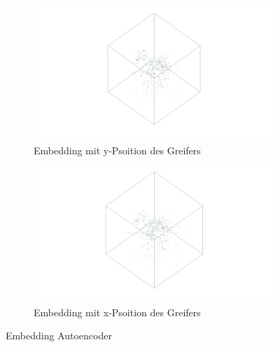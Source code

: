 	  \begin{figure}[h]
		\centering
		\begin{subfigure}[c]{0.49\textwidth}			
			\includegraphics[width=1\textwidth,center]{bilder/Hauptteil/Autoencoder_Grappel_Detection/y_embKopie.png}
			\caption{Embedding mit y-Psoition des Greifers}
			\label{img:BoxPlot_RegressionAufAutoencoder}	
		\end{subfigure}
		\begin{subfigure}[c]{0.49\textwidth}			
			\includegraphics[width=1\textwidth, center]{bilder/Hauptteil/Autoencoder_Grappel_Detection/x_embKopie.png}
			\caption{Embedding mit x-Psoition des Greifers}
			\label{img:RecalllIoUt_RegressionAufAutoencoder}	
		\end{subfigure}
		\caption{Embedding Autoencoder}
		\label{img:EmbeddingAE_V}
	\end{figure}
	
